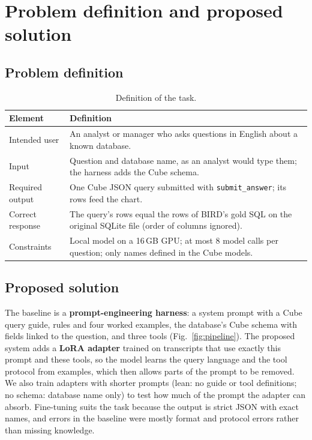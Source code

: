 \section{Problem definition and proposed solution}

\subsection{Problem definition}
\begin{table}[!htbp]
\centering
\small
\caption{Definition of the task.}\label{tab:task}
\begin{tabularx}{0.95\linewidth}{@{}lX@{}}
\toprule
\textbf{Element} & \textbf{Definition}\\
\midrule
Intended user & An analyst or manager who asks questions in English about a known database.\\
Input & Question and database name, as an analyst would type them; the harness adds the Cube schema.\\
Required output & One Cube JSON query submitted with \texttt{submit\_answer}; its rows feed the chart.\\
Correct response & The query's rows equal the rows of BIRD's gold SQL on the original SQLite file (order of columns ignored).\\
Constraints & Local model on a 16\,GB GPU; at most 8 model calls per question; only names defined in the Cube models.\\
\bottomrule
\end{tabularx}
\end{table}

\subsection{Proposed solution}
The baseline is a \textbf{prompt-engineering harness}: a system prompt with a Cube query guide, rules and four worked examples, the database's Cube schema with fields linked to the question, and three tools (Fig.~\ref{fig:pipeline}). The proposed system adds a \textbf{LoRA adapter} trained on transcripts that use exactly this prompt and these tools, so the model learns the query language and the tool protocol from examples, which then allows parts of the prompt to be removed. We also train adapters with shorter prompts (lean: no guide or tool definitions; no schema: database name only) to test how much of the prompt the adapter can absorb. Fine-tuning suits the task because the output is strict JSON with exact names, and errors in the baseline were mostly format and protocol errors rather than missing knowledge.

